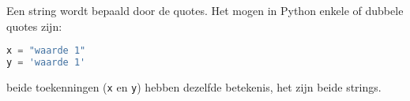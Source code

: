 Een string wordt bepaald door de quotes. Het mogen in Python enkele of dubbele quotes zijn:
\begin{lstlisting}[language=python]
x = "waarde 1"
y = 'waarde 1'
\end{lstlisting}
beide toekenningen (\texttt{x} en \texttt{y}) hebben dezelfde betekenis, het zijn beide strings.

